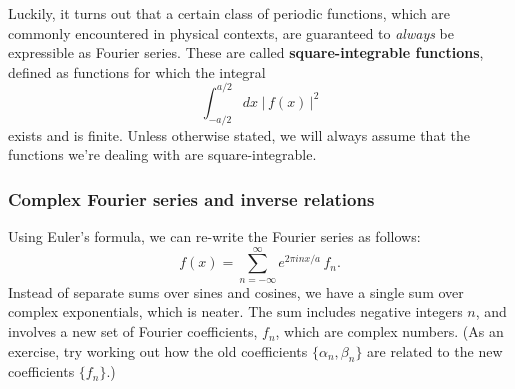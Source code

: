 \documentclass[10pt,a4paper]{article}
\begin{document}
Luckily, it turns out that a certain class of periodic functions, which
are commonly encountered in physical contexts, are guaranteed to
\emph{always} be expressible as Fourier series. These are called
\textbf{square-integrable functions}, defined as functions for which the
integral
\begin{equation}
\int_{-a/2}^{a/2} dx\; \big|\,f(x)\,\big|^2
\end{equation}
exists and is finite. Unless otherwise stated, we will always assume
that the functions we're dealing with are square-integrable.

\subsubsection{Complex Fourier series and inverse relations}
\label{complex-fourier-series-and-inverse-relations}

Using Euler's formula, we can re-write the Fourier series as follows:
\begin{equation}
f(x) = \sum_{n=-\infty}^\infty e^{2\pi i n x/a}\, f_n.
\end{equation}
Instead of separate sums over sines and cosines, we have a single sum
over complex exponentials, which is neater. The sum includes negative
integers $n$, and involves a new set of Fourier coefficients, $f_n$,
which are complex numbers. (As an exercise, try working out how the
old coefficients $\{\alpha_n, \beta_n\}$ are related to the new
coefficients $\{f_n\}$.)
\end{document}
